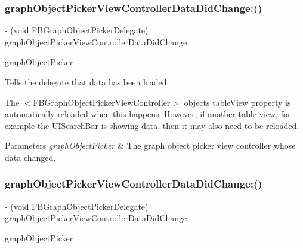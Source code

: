 \subsubsection{\texorpdfstring{graph\+Object\+Picker\+View\+Controller\+Data\+Did\+Change\+:()}{graphObjectPickerViewControllerDataDidChange:()}\hspace{0.1cm}{\footnotesize\ttfamily [2/5]}}
{\footnotesize\ttfamily -\/ (void F\+B\+Graph\+Object\+Picker\+Delegate) graph\+Object\+Picker\+View\+Controller\+Data\+Did\+Change\+: \begin{DoxyParamCaption}\item[{(\hyperlink{interfaceFBGraphObjectPickerViewController}{F\+B\+Graph\+Object\+Picker\+View\+Controller} $\ast$)}]{graph\+Object\+Picker }\end{DoxyParamCaption}\hspace{0.3cm}{\ttfamily [optional]}}

Tells the delegate that data has been loaded.

The $<$\+F\+B\+Graph\+Object\+Picker\+View\+Controller$>$ object\textquotesingle{}s {\ttfamily table\+View} property is automatically reloaded when this happens. However, if another table view, for example the {\ttfamily U\+I\+Search\+Bar} is showing data, then it may also need to be reloaded.


\begin{DoxyParams}{Parameters}
{\em graph\+Object\+Picker} & The graph object picker view controller whose data changed. \\
\hline
\end{DoxyParams}
\mbox{\label{protocolFBGraphObjectPickerDelegate_01-p_a7444276f3c20567235206a1be36074cb}} 
\subsubsection{\texorpdfstring{graph\+Object\+Picker\+View\+Controller\+Data\+Did\+Change\+:()}{graphObjectPickerViewControllerDataDidChange:()}\hspace{0.1cm}{\footnotesize\ttfamily [3/5]}}
{\footnotesize\ttfamily -\/ (void F\+B\+Graph\+Object\+Picker\+Delegate) graph\+Object\+Picker\+View\+Controller\+Data\+Did\+Change\+: \begin{DoxyParamCaption}\item[{(\hyperlink{interfaceFBGraphObjectPickerViewController}{F\+B\+Graph\+Object\+Picker\+View\+Controller} $\ast$)}]{graph\+Object\+Picker }\end{DoxyParamCaption}\hspace{0.3cm}{\ttfamily [optional]}}

